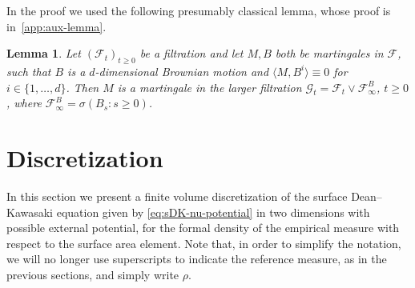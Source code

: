 \documentclass[11pt, a4paper]{article}
\newtheorem{lemma}[theorem]{Lemma}
\begin{document}


In the proof we used the following presumably classical lemma, whose proof is in~\ref{app:aux-lemma}.


\begin{lemma}\label{lem:martingale-filtration}
  Let $(\mathcal{F}_t)_{t \geq 0}$ be a filtration and let $M, B$ both be
  martingales in $\mathcal{F}$, such that $B$ is a $d$-dimensional Brownian
  motion and $\langle M, B^i \rangle \equiv 0$ for $i \in \{ 1, \ldots, d \}$.
  Then $M$ is a martingale in the larger filtration $\mathcal{G}_t
  =\mathcal{F}_t \vee \mathcal{F}^B_{\infty}$, $t \ge 0$, where $\mathcal{F}^B_{\infty} =
  \sigma (B_s : s \geq 0)$.
\end{lemma}













\section{Discretization}\label{sec:discretization}




In this section we present a finite volume discretization of the surface Dean--Kawasaki equation given by \eqref{eq:sDK-nu-potential} in two dimensions with possible external potential, for the formal density of the empirical measure with respect to the surface area element. Note that, in order to simplify the notation, we will no longer use superscripts to indicate the reference measure, as in the previous sections, and simply write $\rho$. 
\end{document}

